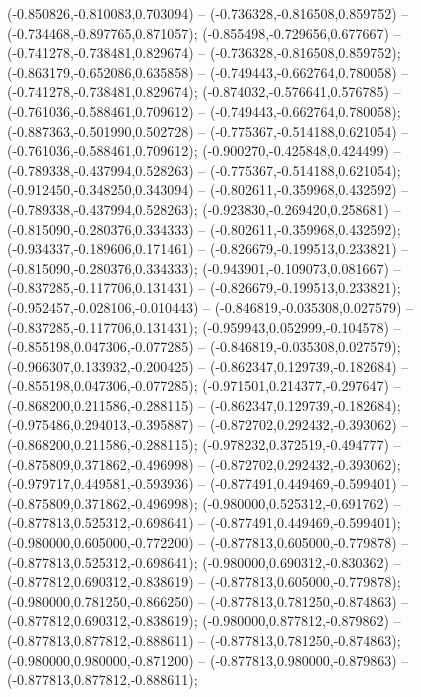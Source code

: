  (-0.850826,-0.810083,0.703094) -- (-0.736328,-0.816508,0.859752) -- (-0.734468,-0.897765,0.871057);
 (-0.855498,-0.729656,0.677667) -- (-0.741278,-0.738481,0.829674) -- (-0.736328,-0.816508,0.859752);
 (-0.863179,-0.652086,0.635858) -- (-0.749443,-0.662764,0.780058) -- (-0.741278,-0.738481,0.829674);
 (-0.874032,-0.576641,0.576785) -- (-0.761036,-0.588461,0.709612) -- (-0.749443,-0.662764,0.780058);
 (-0.887363,-0.501990,0.502728) -- (-0.775367,-0.514188,0.621054) -- (-0.761036,-0.588461,0.709612);
 (-0.900270,-0.425848,0.424499) -- (-0.789338,-0.437994,0.528263) -- (-0.775367,-0.514188,0.621054);
 (-0.912450,-0.348250,0.343094) -- (-0.802611,-0.359968,0.432592) -- (-0.789338,-0.437994,0.528263);
 (-0.923830,-0.269420,0.258681) -- (-0.815090,-0.280376,0.334333) -- (-0.802611,-0.359968,0.432592);
 (-0.934337,-0.189606,0.171461) -- (-0.826679,-0.199513,0.233821) -- (-0.815090,-0.280376,0.334333);
 (-0.943901,-0.109073,0.081667) -- (-0.837285,-0.117706,0.131431) -- (-0.826679,-0.199513,0.233821);
 (-0.952457,-0.028106,-0.010443) -- (-0.846819,-0.035308,0.027579) -- (-0.837285,-0.117706,0.131431);
 (-0.959943,0.052999,-0.104578) -- (-0.855198,0.047306,-0.077285) -- (-0.846819,-0.035308,0.027579);
 (-0.966307,0.133932,-0.200425) -- (-0.862347,0.129739,-0.182684) -- (-0.855198,0.047306,-0.077285);
 (-0.971501,0.214377,-0.297647) -- (-0.868200,0.211586,-0.288115) -- (-0.862347,0.129739,-0.182684);
 (-0.975486,0.294013,-0.395887) -- (-0.872702,0.292432,-0.393062) -- (-0.868200,0.211586,-0.288115);
 (-0.978232,0.372519,-0.494777) -- (-0.875809,0.371862,-0.496998) -- (-0.872702,0.292432,-0.393062);
 (-0.979717,0.449581,-0.593936) -- (-0.877491,0.449469,-0.599401) -- (-0.875809,0.371862,-0.496998);
 (-0.980000,0.525312,-0.691762) -- (-0.877813,0.525312,-0.698641) -- (-0.877491,0.449469,-0.599401);
 (-0.980000,0.605000,-0.772200) -- (-0.877813,0.605000,-0.779878) -- (-0.877813,0.525312,-0.698641);
 (-0.980000,0.690312,-0.830362) -- (-0.877812,0.690312,-0.838619) -- (-0.877813,0.605000,-0.779878);
 (-0.980000,0.781250,-0.866250) -- (-0.877813,0.781250,-0.874863) -- (-0.877812,0.690312,-0.838619);
 (-0.980000,0.877812,-0.879862) -- (-0.877813,0.877812,-0.888611) -- (-0.877813,0.781250,-0.874863);
 (-0.980000,0.980000,-0.871200) -- (-0.877813,0.980000,-0.879863) -- (-0.877813,0.877812,-0.888611);
